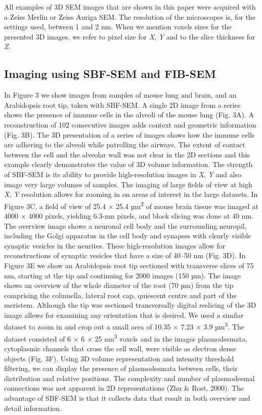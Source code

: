 \documentclass{article}
\begin{document}
All examples of 3D SEM images that are shown in this paper were acquired with a Zeiss Merlin or Zeiss Auriga SEM. The resolution of the microscopes is, for the settings used, between 1 and 2 nm. When we mention voxels sizes for the presented 3D images, we refer to pixel size for \textit{X}, \textit{Y} and to the slice thickness for \textit{Z}.

\subsection*{Imaging using SBF-SEM and FIB-SEM}

In Figure 3 we show images from samples of mouse lung and brain, and an Arabidopsis root tip, taken with SBF-SEM. A single 2D image from a series shows the presence of immune cells in the alveoli of the mouse lung (Fig. 3A). A reconstruction of 102 consecutive images adds context and geometric information (Fig. 3B). The 3D presentation of a series of images shows how the immune cells are adhering to the alveoli while patrolling the airways. The extent of contact between the cell and the alveolar wall was not clear in the 2D sections and this example clearly demonstrates the value of 3D volume information. The strength of SBF-SEM is its ability to provide high-resolution images in \textit{X}, \textit{Y} and also image very large volumes of samples. The imaging of large fields of view at high \textit{X}, \textit{Y} resolution allows for zooming in on areas of interest in the large datasets. In Figure 3C, a field of view of 25.4 × 25.4 µm\textsuperscript{2} of mouse brain tissue was imaged at 4000 × 4000 pixels, yielding 6.3-nm pixels, and block slicing was done at 40 nm. The overview image shows a neuronal cell body and the surrounding neuropil, including the Golgi apparatus in the cell body and synapses with clearly visible synaptic vesicles in the neurites. These high-resolution images allow for reconstructions of synaptic vesicles that have a size of 40–50 nm (Fig. 3D). In Figure 3E we show an Arabidopsis root tip sectioned with transverse slices of 75 nm, starting at the tip and continuing for 2000 images (150 µm). The image shows an overview of the whole diameter of the root (70 µm) from the tip comprising the columella, lateral root cap, quiescent centre and part of the meristem. Although the tip was sectioned transversally digital reslicing of the 3D image allows for examining any orientation that is desired. We used a similar dataset to zoom in and crop out a small area of 10.35 × 7.23 × 3.9 µm\textsuperscript{3}. The dataset consisted of 6 × 6 × 25 nm\textsuperscript{3} voxels and in the images plasmodesmata, cytoplasmic channels that cross the cell wall, were visible as electron dense objects (Fig. 3F). Using 3D volume representation and intensity threshold filtering, we can display the presence of plasmodesmata between cells, their distribution and relative positions. The complexity and number of plasmodesmal connections was not apparent in 2D representations (Zhu \& Rost, 2000). The advantage of SBF-SEM is that it collects data that result in both overview and detail information.
\end{document}
